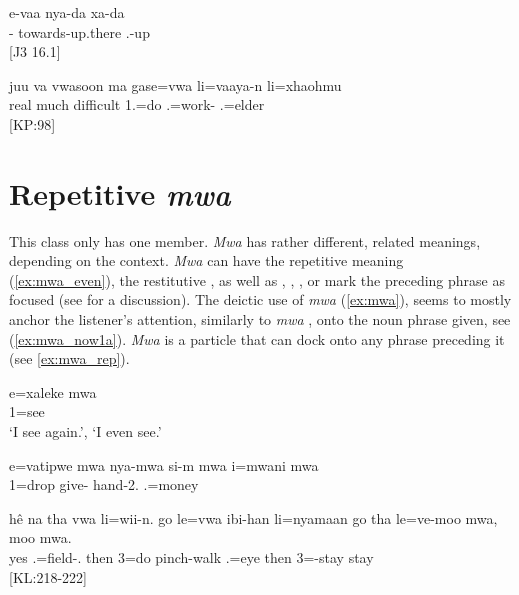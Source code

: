 \ea\label{ex:vaa1}
\gll e-vaa nya-da xa-da\\
 - towards-up.there .-up \\
\glt {} {[J3 16.1]}
\z


\ea \label{ex:vaa2}
\gll juu va vwasoon ma gase=vwa li=vaaya-n li=xhaohmu\\
 real much difficult  1.=do .=work- .=elder\\
\glt {} {[KP:98]}
\z



\section{Repetitive \textit{mwa}}
\label{sec:WCRepetitive}

This class only has one member. \textit{Mwa} has rather different, related meanings, depending on the context. \textit{Mwa} can have the repetitive meaning  (\ref{ex:mwa_even}), the restitutive , as well as , , , or mark the preceding phrase as focused (see  for a discussion). The deictic use of \textit{mwa}  (\ref{ex:mwa}), seems to mostly anchor the listener's attention, similarly to \textit{mwa} , onto the noun phrase given, see (\ref{ex:mwa_now1a}). \textit{Mwa} is a particle that can dock onto any phrase preceding it (see \ref{ex:mwa_rep}).

\ea\label{ex:mwa_even}
\gll e=xaleke mwa\\
 1=see \\
\glt `I see again.', `I even see.'
\z

\ea
\label{ex:mwa_rep}
\gll e=vatipwe mwa nya-mwa si-m mwa i=mwani mwa\\
 1=drop  give- hand-2.  .=money \\
\glt {}
\z


\ea\label{ex:mwa}
\gll hê na tha vwa li=wii-n. go le=vwa ibi-han li=nyamaan go tha le=ve-moo mwa, moo mwa. \\
 yes    .=field-. then 3=do pinch-walk .=eye then  3=-stay  stay \\
\glt {} {[KL:218-222]}
\z


